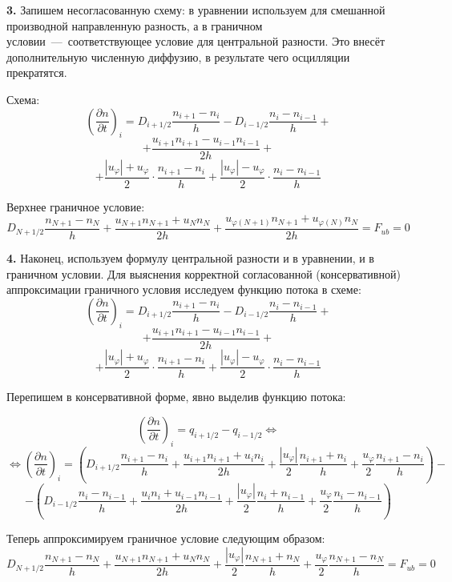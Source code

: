 \documentclass[2pt, a4paper, fleqn]{extarticle}
\begin{document}
\medskip

{\bf 3.} Запишем несогласованную схему: в уравнении используем для смешанной производной направленную разность, а в граничном условии~---~соответствующее условие для центральной разности. Это внесёт дополнительную численную диффузию, в результате чего осцилляции прекратятся.

Схема: $$\left(\dfrac{\partial n}{\partial t}\right)_i = D_{i+1/2}\dfrac{n_{i+1}-n_i}{h} - D_{i-1/2}\dfrac{n_{i}-n_{i-1}}{h}+$$ $$+\dfrac{u_{i+1}n_{i+1}-u_{i-1}n_{i-1}}{2h} + $$ $$+\dfrac{|u_\varphi|+u_\varphi}{2}\cdot\dfrac{n_{i+1}-n_i}{h}+\dfrac{|u_\varphi|-u_\varphi}{2}\cdot\dfrac{n_i-n_{i-1}}{h}$$

Верхнее граничное условие: $$D_{N+1/2}\dfrac{n_{N+1}-n_{N}}{h}+\dfrac{u_{N+1}n_{N+1}+u_{N}n_{N}}{2h}+\dfrac{u_{\varphi(N+1)}n_{N+1}+u_{\varphi(N)}n_{N}}{2h} = F_{ub} = 0$$

\medskip

{\bf 4.} Наконец, используем формулу центральной разности и в уравнении, и в граничном условии. Для выяснения корректной согласованной (консервативной) аппроксимации граничного условия исследуем функцию потока в схеме: $$\left(\dfrac{\partial n}{\partial t}\right)_i = D_{i+1/2}\dfrac{n_{i+1}-n_i}{h} - D_{i-1/2}\dfrac{n_{i}-n_{i-1}}{h}+$$ $$+\dfrac{u_{i+1}n_{i+1}-u_{i-1}n_{i-1}}{2h} + $$ $$+\dfrac{|u_\varphi|+u_\varphi}{2}\cdot\dfrac{n_{i+1}-n_i}{h}+\dfrac{|u_\varphi|-u_\varphi}{2}\cdot\dfrac{n_i-n_{i-1}}{h}$$

Перепишем в консервативной форме, явно выделив функцию потока:

$$\left(\dfrac{\partial n}{\partial t}\right)_i = q_{i+1/2}-q_{i-1/2} \Leftrightarrow $$ $$\Leftrightarrow \left(\dfrac{\partial n}{\partial t}\right)_i = \left(D_{i+1/2}\dfrac{n_{i+1}-n_i}{h} + \dfrac{u_{i+1}n_{i+1}+u_in_i}{2h}+\dfrac{|u_\varphi|}{2}\dfrac{n_{i+1}+n_{i}}{h}+\dfrac{u_\varphi}{2}\dfrac{n_{i+1}-n_i}{h}\right) - $$ $$ - \left(D_{i-1/2}\dfrac{n_{i}-n_{i-1}}{h} + \dfrac{u_{i}n_{i}+u_{i-1}n_{i-1}}{2h}+\dfrac{|u_\varphi|}{2}\dfrac{n_{i}+n_{i-1}}{h}+\dfrac{u_\varphi}{2}\dfrac{n_{i}-n_{i-1}}{h}\right)$$

Теперь аппроксимируем граничное условие следующим образом: $$D_{N+1/2}\dfrac{n_{N+1}-n_N}{h}+\dfrac{u_{N+1}n_{N+1}+u_Nn_N}{2h}+\dfrac{|u_\varphi|}{2}\dfrac{n_{N+1}+n_{N}}{h}+\dfrac{u_\varphi}{2}\dfrac{n_{N+1}-n_N}{h} = F_{ub} = 0$$
\end{document}
